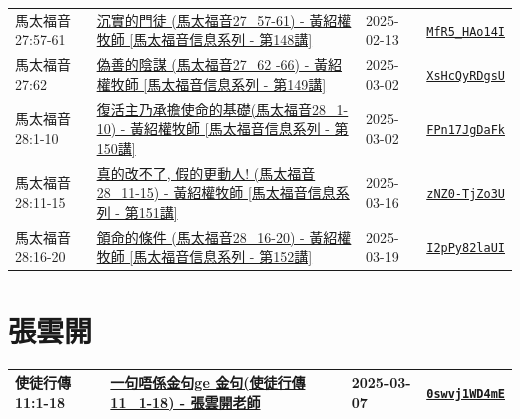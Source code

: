 \documentclass{book}
\begin{document}
{\begin{xltabular}{\textwidth}{|p{0.15\textwidth} p{0.6\textwidth}|p{0.07\textwidth} p{0.1\textwidth}|}
馬太福音 27:57-61 & \hyperref[sec:MfR5_HAo14I]{沉實的門徒  (馬太福音27\_57-61) - 黃紹權牧師  [馬太福音信息系列 - 第148講]} & 2025-02-13 & \href{https://youtube.com/watch?v=MfR5_HAo14I}{\texttt{MfR5\_HAo14I}} \\
馬太福音 27:62 & \hyperref[sec:XsHcQyRDgsU]{偽善的陰謀 (馬太福音27\_62 -66) - 黃紹權牧師  [馬太福音信息系列 - 第149講]} & 2025-03-02 & \href{https://youtube.com/watch?v=XsHcQyRDgsU}{\texttt{XsHcQyRDgsU}} \\
馬太福音 28:1-10 & \hyperref[sec:FPn17JgDaFk]{復活主乃承擔使命的基礎(馬太福音28\_1-10) - 黃紹權牧師  [馬太福音信息系列 - 第150講]} & 2025-03-02 & \href{https://youtube.com/watch?v=FPn17JgDaFk}{\texttt{FPn17JgDaFk}} \\
馬太福音 28:11-15 & \hyperref[sec:zNZ0_TjZo3U]{真的改不了, 假的更動人! (馬太福音28\_11-15) - 黃紹權牧師  [馬太福音信息系列 - 第151講]} & 2025-03-16 & \href{https://youtube.com/watch?v=zNZ0-TjZo3U}{\texttt{zNZ0-TjZo3U}} \\
馬太福音 28:16-20 & \hyperref[sec:I2pPy82laUI]{領命的條件 (馬太福音28\_16-20) - 黃紹權牧師  [馬太福音信息系列 - 第152講]} & 2025-03-19 & \href{https://youtube.com/watch?v=I2pPy82laUI}{\texttt{I2pPy82laUI}} \\
\end{xltabular}
}


\chapter{張雲開}\label{ch:preacher1}
\begin{multicols}{3}
\minitoc
\end{multicols}
{ \scriptsize


\begin{xltabular}{\textwidth}{|p{0.15\textwidth} p{0.6\textwidth}|p{0.07\textwidth} p{0.1\textwidth}|}
\hline
使徒行傳 11:1-18 & \hyperref[sec:0swvj1WD4mE]{一句唔係金句ge 金句(使徒行傳11\_1-18) - 張雲開老師} & 2025-03-07 & \href{https://youtube.com/watch?v=0swvj1WD4mE}{\texttt{0swvj1WD4mE}} \\
\hline
\end{xltabular}
}
\newpage
\end{document}
